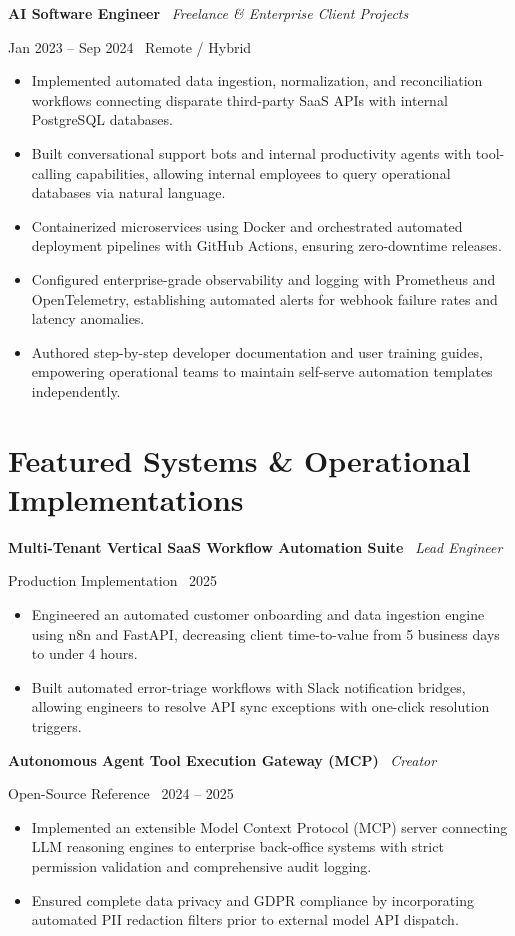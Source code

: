 \documentclass[a4paper,10pt]{article}
\newcommand{\role}[4]{%
  \vspace{2pt}\noindent
  \begin{minipage}[t]{0.70\textwidth}\raggedright\textbf{#1} \textbullet\ \textit{#3}\end{minipage}%
  \hfill
  \begin{minipage}[t]{0.28\textwidth}\raggedleft\footnotesize\color{gray}#2 \textbullet\ #4\end{minipage}%
  \vspace{1pt}%
}
\begin{document}
\role{AI Software Engineer}{Jan 2023 -- Sep 2024}{Freelance \& Enterprise Client Projects}{Remote / Hybrid}
\begin{itemize}
  \item Implemented automated data ingestion, normalization, and reconciliation workflows connecting disparate third-party SaaS APIs with internal PostgreSQL databases.
  \item Built conversational support bots and internal productivity agents with tool-calling capabilities, allowing internal employees to query operational databases via natural language.
  \item Containerized microservices using Docker and orchestrated automated deployment pipelines with GitHub Actions, ensuring zero-downtime releases.
  \item Configured enterprise-grade observability and logging with Prometheus and OpenTelemetry, establishing automated alerts for webhook failure rates and latency anomalies.
  \item Authored step-by-step developer documentation and user training guides, empowering operational teams to maintain self-serve automation templates independently.
\end{itemize}

\section{Featured Systems \& Operational Implementations}

\role{Multi-Tenant Vertical SaaS Workflow Automation Suite}{Production Implementation}{Lead Engineer}{2025}
\begin{itemize}
  \item Engineered an automated customer onboarding and data ingestion engine using n8n and FastAPI, decreasing client time-to-value from 5 business days to under 4 hours.
  \item Built automated error-triage workflows with Slack notification bridges, allowing engineers to resolve API sync exceptions with one-click resolution triggers.
\end{itemize}

\role{Autonomous Agent Tool Execution Gateway (MCP)}{Open-Source Reference}{Creator}{2024 -- 2025}
\begin{itemize}
  \item Implemented an extensible Model Context Protocol (MCP) server connecting LLM reasoning engines to enterprise back-office systems with strict permission validation and comprehensive audit logging.
  \item Ensured complete data privacy and GDPR compliance by incorporating automated PII redaction filters prior to external model API dispatch.
\end{itemize}
\end{document}
